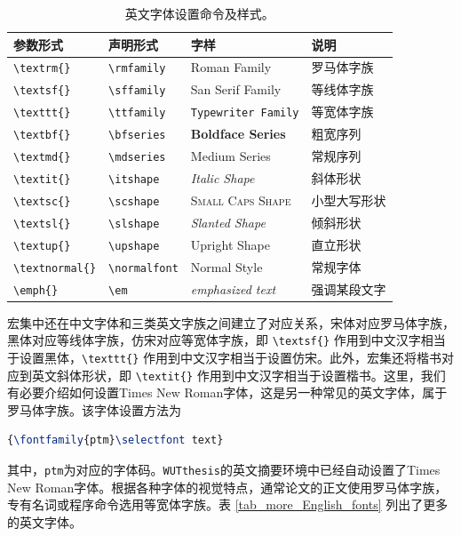 \begin{table}
\caption{英文字体设置命令及样式。}
\begin{center}
\begin{tabular}{>{\centering\arraybackslash}m{3.0cm}|>{\centering\arraybackslash}m{2.5cm}|>{\centering\arraybackslash}m{4.0cm}|>{\centering\arraybackslash}m{3.0cm}}
\hline
\hline
参数形式 & 声明形式 & 字样 & 说明 \bigstrut \\ \hline
\verb"\textrm{}" & \verb"\rmfamily" & \textrm{Roman Family} & 罗马体字族 \bigstrut \\ \hline
\verb"\textsf{}" & \verb"\sffamily" & \textsf{San Serif Family} & 等线体字族 \bigstrut \\ \hline
\verb"\texttt{}" & \verb"\ttfamily" & \texttt{Typewriter Family} & 等宽体字族 \bigstrut \\ \hline
\verb"\textbf{}" & \verb"\bfseries" & \textbf{Boldface Series} & 粗宽序列 \bigstrut \\ \hline
\verb"\textmd{}" & \verb"\mdseries" & \textmd{Medium Series} & 常规序列 \bigstrut \\ \hline
\verb"\textit{}" & \verb"\itshape"  & \textit{Italic Shape} & 斜体形状 \bigstrut \\ \hline
\verb"\textsc{}" & \verb"\scshape"  & \textsc{Small Caps Shape} & 小型大写形状 \bigstrut \\ \hline
\verb"\textsl{}" & \verb"\slshape"  & \textsl{Slanted Shape} & 倾斜形状 \bigstrut \\ \hline
\verb"\textup{}" & \verb"\upshape"  & \textup{Upright Shape} & 直立形状 \bigstrut \\ \hline
\verb"\textnormal{}" & \verb"\normalfont" & \textnormal{Normal Style} & 常规字体 \bigstrut \\ \hline
\verb"\emph{}" & \verb"\em" & \emph{emphasized text} & 强调某段文字 \bigstrut \\ \hline
\hline
\end{tabular}
\end{center}
\label{tab_font_style}
\end{table}

\par {\CTeX}宏集中还在中文字体和三类英文字族之间建立了对应关系，宋体对应罗马体字族，黑体对应等线体字族，仿宋对应等宽体字族，即 \verb"\textsf{}" 作用到中文汉字相当于设置黑体，\verb"\texttt{}" 作用到中文汉字相当于设置仿宋。此外，{\CTeX}宏集还将楷书对应到英文斜体形状，即 \verb"\textit{}" 作用到中文汉字相当于设置楷书。这里，我们有必要介绍如何设置{\selectfont Times New Roman}字体，这是另一种常见的英文字体，属于罗马体字族。该字体设置方法为
\begin{lstlisting}[language=TeX]
{\fontfamily{ptm}\selectfont text}
\end{lstlisting}
其中，\texttt{ptm}为对应的字体码。\texttt{WUTthesis}的英文摘要环境中已经自动设置了{\selectfont Times New Roman}字体。根据各种字体的视觉特点，通常论文的正文使用罗马体字族，专有名词或程序命令选用等宽体字族。表 \ref{tab_more_English_fonts} 列出了更多的英文字体。



